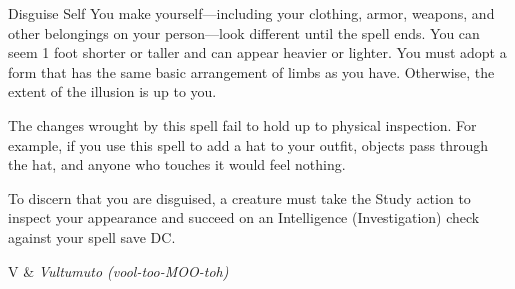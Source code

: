 \begin{Spell}[
    level=1st,
    time=1 Action,
    range=Self,
    components={V, S},
    duration=1 Hour,
    school=Illusion,
    attack=None,
    effect=Shapechanging
]{Disguise Self}
You make yourself---including your clothing, armor, weapons, and other belongings on your person---look different until the spell ends. You can seem 1 foot shorter or taller and can appear heavier or lighter. You must adopt a form that has the same basic arrangement of limbs as you have. Otherwise, the extent of the illusion is up to you.

The changes wrought by this spell fail to hold up to physical inspection. For example, if you use this spell to add a hat to your outfit, objects pass through the hat, and anyone who touches it would feel nothing.

To discern that you are disguised, a creature must take the Study action to inspect your appearance and succeed on an Intelligence (Investigation) check against your spell save DC.

\begin{components}
V & \textit{Vultumuto (vool-too-MOO-toh)}
\end{components}
\end{Spell}


